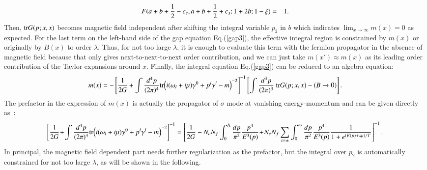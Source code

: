 \documentclass[aps,prd,amsmath,two column,amssymb,showpacs]{revtex4}
\begin{document}
\begin{widetext}
\begin{eqnarray}
F(a+b+{1\over2}-c_s,a+b+{1\over2}+c_s;1+2b;1-\xi)&=&1.
\end{eqnarray}
Then, ${\rm tr}G(p;x,x)$ becomes magnetic field independent after shifting the integral variable $p_2$ in $b$ which indicates $\lim_{x\rightarrow\infty}m(x)=0$ as expected. For the last term on the left-hand side of the gap equation Eq.(\ref{gap3}), the effective integral region is constrained by $m(x)$ or originally by $B(x)$ to order $\lambda$. Thus, for not too large $\lambda$, it is enough to evaluate this term with the fermion propagator in the absence of magnetic field because that only gives next-to-next-to-next order contribution, and we can just take $m(x')\approx m(x)$ as its leading order contribution of the Taylor expansions around $x$. Finally, the integral equation Eq.(\ref{gap3}) can be reduced to an algebra equation:
\begin{eqnarray}\label{gapx}
m(x)=-\left[{1\over2G}+\int{d^4p\over (2\pi)^4}{\rm tr}\Big(i(\omega_l+i\mu)\gamma^0+p^i\gamma^i-m\Big)^{-2}\right]^{-1}\left[\int{d^3p\over (2\pi)^3}~{\rm tr}G(p;x,x)-(B\rightarrow0)\right].
\end{eqnarray}
The prefactor in the expression of $m(x)$ is actually the propagator of $\sigma$ mode at vanishing energy-momentum and can be given directly as~\cite{Klevansky:1992qe}:
\begin{eqnarray}
\left[{1\over2G}\!+\!\int{d^4p\over (2\pi)^4}{\rm tr}\Big(i(\omega_l+i\mu)\gamma^0+p^i\gamma^i-m\Big)^{-2}\right]^{-1}=\left[{1\over2G}-N_cN_f\int_0^\Lambda{dp\over \pi^2}{p^4\over E^3(p)}\!+\!N_cN_f\sum_{s=\pm}\int_0^\infty{dp\over \pi^2}{p^4\over E^3(p)}{1\over 1+e^{(E(p)+s\mu)/T}}\right]^{-1}.
\end{eqnarray}
In principal, the magnetic field dependent part needs further regularization as the prefactor, but the integral over $p_2$ is automatically constrained for not too large $\lambda$, as will be shown in the following.



\end{widetext}
\end{document}

